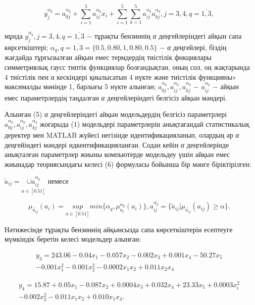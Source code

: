 \begin{equation}
y_j^{\alpha_q}=a_{0j}^{\alpha_q}+\sum_{i=1}^5a_{ij}^{\alpha_q}x_i+\sum_{i=1}^5\sum_{k=1}^5a_{ij}^{\alpha_q}a_{kj}^{\alpha_q},j=3,4,q=\overline{1,3},
\end{equation}

\begin{multicols}{2}
мұнда $y_j^{\alpha_q},j=3,4,q=\overline{1,3}$ − тұрақты
бензиннің \emph{α} деңгейлеріндегі айқын сапа көрсеткіштері;
$\alpha_q,q=\overline{1,3}=\{0.5,0.80,1,0.80,0.5\}$ − \emph{α}
деңгейлері, біздің жағдайда тұрғызылған айқын емес термдердің
тиістілік фнкциялары симметриялық гаусс типтік функциялар
болғандықтан, оның сол, оң жақтарында 4 тиістілік пен α кескіндері
қиылысатын 4 нүкте және тиістілік функцияны» максималды мәнінде 1,
барлығы 5 нүкте алынған;
$a_{0j}^{\alpha_q},a_{ij}^{\alpha_q},a_{kj}^{\alpha_q}$ −
$a_{ij}^{\alpha_q}$ − айқын емес параметрлердің таңдалған
\emph{α} деңгейлеріндегі белгісіз айқын мәндері.

Алынған (5) \emph{α} деңгейлеріндегі айқын модельдердің белгісіз
параметрлері $a_{0j}^{\alpha_q},a_{ij}^{\alpha_q},a_{kj}^{\alpha_q}$
жоғарыда (1) модельдері параметрлерін анықтағандай статистикалық
деректер мен MATLAB жүйесі негізінде идентификацияланып, олардың
әр \emph{α} деңгейіндегі мәндері идкентификацияланған. Содан
кейін \emph{α} деңгейлерінде анықталған параметрлер жиыны компьютерде
модельдеу үшін айқын емес жиынадар теориясындағы келесі (6) формуласы
бойынша бір мәнге біріктірілген:

$\tilde{a}_{ij}=\underset{\alpha \in [0.51]}{\cup a_{ij}^{\alpha_q}}$ немесе
\end{multicols}

\begin{equation}
\mu_{\tilde{a_{ij}}}(a_i)=\underset{\alpha \in [0.51]}{sup}min\{\alpha_q,\mu_{a_i}^{\alpha_q}(a_i)\},a_{ij}^{\alpha_q}=\{\tilde{a}_{ij}|\mu_{\tilde{a_{ij}}}(a_{ij})\geq \alpha\}.
\end{equation}

Нәтижесінде тұрақты бензиннің айқынсызда сапа көрсеткіштерін есептеуге
мүмкіндік беретін келесі модельдер алынған:

\begin{multline}
y_3 = 243.06 - 0.04x_1 - 0.057x_2 - 0.002x_3 + 0.001x_4 - 50.27x_5 \\
- 0.001x_1^2 - 0.001x_2^2 - 0.0002x_1x_2 + 0.011x_2x_4
\end{multline}

\begin{multline}
y_4=15.87+0.05x_1-0.087x_2+0.0004x_3+0.032x_4+23.33x_5+0.0003x_i^2 \\
-0.002x_2^2-0.011x_1x_2+0.010x_1x_4.
\end{multline}

